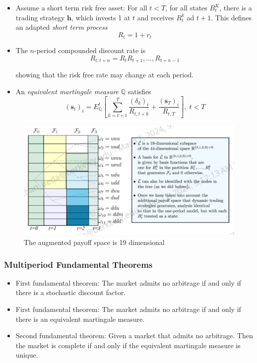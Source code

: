 \documentclass[11pt]{article}
\begin{document}
\begin{itemize}
    \item Assume a short term risk free asset: For all $t<T$, for all states $B_t^K$, there is 
    a trading strategy $\boldsymbol{h}$, which invests 1 at $t$ and receives $R_t^k$ ad $t+1$. 
    This defines an adapted \textit{short term process}
    \[R_t = 1 + r_t\]

    \item The $n$-period compounded discount rate is 
    \[R_{t, t+n} = R_t R_{t+1} , \ldots, R_{t+n-1}\]

    showing that the risk free rate may change at each period. 
    
    \item An \textit{equivalent martingale measure} $\mathbb{Q}$ satisfies 
    \[
    {(\boldsymbol{s}_t)}_i = E_{\mathbb{Q}}^t \left[ \sum_{k=t+1}^{T} \frac{{(\delta_k)}_i}
    {R_{t,t+k}} + \frac{{(\boldsymbol{s}_T)}_i}{R_{t,T}}\right], \; t < T
    \]
\end{itemize}

\begin{figure}[H] 
    \centering 
    \includegraphics[width=6in]{imgs/embedding.png}
    \caption{The augmented payoff space is 19 dimensional}
\end{figure}

\subsubsection{Multiperiod Fundamental Theorems}
\begin{itemize}
    \item First fundamental theorem: The market admits no arbitrage if and only if there is a 
    stochastic discount factor. 
    \item First fundamental theorem: The market admits no arbitrage if and only if there is an 
    equivalent martingale measure. 
    \item Second fundamental theorem: Given a market that admits no arbitrage. Then the market
    is complete if and only if the equivalent martingale measure is unique.
\end{itemize}
\end{document}
